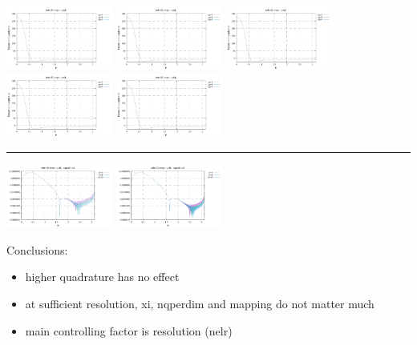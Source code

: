 \noindent
\includegraphics[width=3.5cm]{python_codes/fieldstone_152/RESULTS/exp3/d_t_64_m2}
\includegraphics[width=3.5cm]{python_codes/fieldstone_152/RESULTS/exp3/d_t_64_m3}
\includegraphics[width=3.5cm]{python_codes/fieldstone_152/RESULTS/exp3/d_t_64_m4}
\includegraphics[width=3.5cm]{python_codes/fieldstone_152/RESULTS/exp3/d_t_64_m5}
\includegraphics[width=3.5cm]{python_codes/fieldstone_152/RESULTS/exp3/d_t_64_m6}

\hrule

\includegraphics[width=3.5cm]{python_codes/fieldstone_152/RESULTS/exp3/vel_32_xi}
\includegraphics[width=3.5cm]{python_codes/fieldstone_152/RESULTS/exp3/vel_64_xi}

Conclusions:
\begin{itemize}
\item higher quadrature has no effect
\item at sufficient resolution, xi, nqperdim and mapping do not matter much 
\item main controlling factor is resolution (nelr)
\end{itemize}









